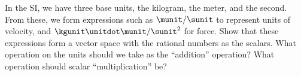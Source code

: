 In the SI, we have three base units, the kilogram, the meter, and the second.
From these, we form expressions such as $\munit/\sunit$ to represent units
of velocity, and $\kgunit\unitdot\munit/\sunit^2$ for force. Show that these
expressions form a vector space with the rational numbers as the scalars.
What operation on the units should we take as the ``addition'' operation?
What operation should scalar ``multiplication'' be?
